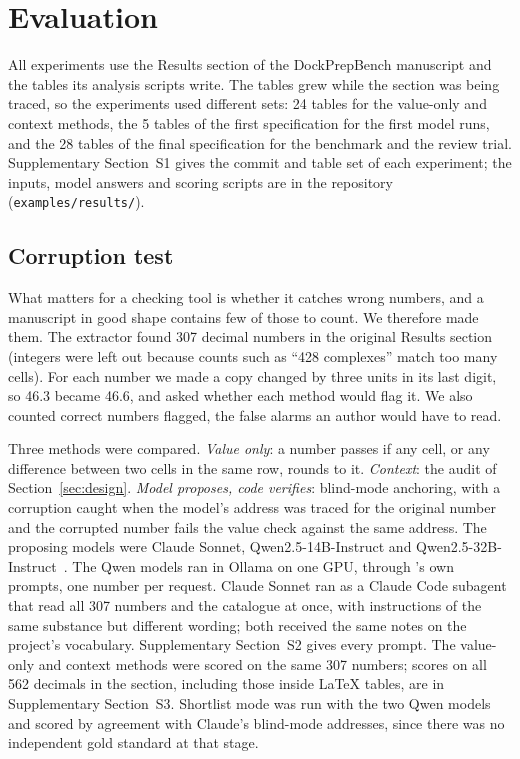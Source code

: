 \section{Evaluation}
\label{sec:evaluation}

All experiments use the Results section of the DockPrepBench manuscript and the tables its
analysis scripts write. The tables grew while the section was being traced, so the experiments
used different sets: 24 tables for the value-only and context methods, the 5 tables of the first
specification for the first model runs, and the 28 tables of the final specification for the
benchmark and the review trial. Supplementary Section~S1 gives the commit and table set of each
experiment; the inputs, model answers and scoring scripts are in the repository
(\texttt{examples/results/}).

\subsection{Corruption test}

What matters for a checking tool is whether it catches wrong numbers, and a manuscript in good
shape contains few of those to count. We therefore made them. The extractor found 307 decimal
numbers in the original Results section (integers were left out because counts such as ``428
complexes'' match too many cells). For each number we made a copy changed by three units in its
last digit, so 46.3 became 46.6, and asked whether each method would flag it. We also counted
correct numbers flagged, the false alarms an author would have to read.

Three methods were compared. \emph{Value only}: a number passes if any cell, or any difference
between two cells in the same row, rounds to it. \emph{Context}: the audit of
Section~\ref{sec:design}. \emph{Model
proposes, code verifies}: blind-mode anchoring, with a corruption caught when the model's address
was traced for the original number and the corrupted number fails the value check against the
same address. The proposing models were Claude Sonnet, Qwen2.5-14B-Instruct and
Qwen2.5-32B-Instruct~\cite{qwen2024qwen25}. The Qwen models ran in Ollama on one GPU, through
\pv{}'s own prompts, one number per request. Claude Sonnet ran as a Claude Code subagent that
read all 307 numbers and the catalogue at once, with instructions of the same substance but
different wording; both received the same notes on the project's vocabulary. Supplementary
Section~S2 gives every prompt. The value-only and context methods were scored on the same 307
numbers; scores on all 562 decimals in the section, including those inside LaTeX tables, are in
Supplementary Section~S3. Shortlist
mode was run with the two Qwen models and scored by agreement with Claude's blind-mode addresses,
since there was no independent gold standard at that stage.

